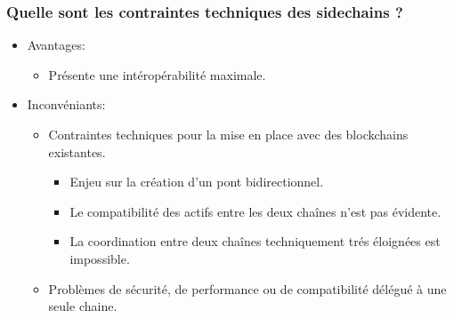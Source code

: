 \begin{frame} 
  \frametitle{Quelle sont les contraintes techniques des sidechains ?} 
  \begin{itemize} 
    \item Avantages:
    \begin{itemize}
      \item Présente une intéropérabilité maximale.
    \end{itemize}
    \item Inconvéniants:
    \begin{itemize}
      \item Contraintes techniques pour la mise en place avec des blockchains existantes.
      \begin{itemize}
        \item Enjeu sur la création d’un pont bidirectionnel.
        \item Le compatibilité des actifs entre les deux chaînes n'est pas évidente. 
        \item La coordination entre deux chaînes techniquement trés éloignées est impossible.
      \end{itemize}
      \item Problèmes de sécurité, de performance ou de compatibilité délégué à une seule chaine.
    \end{itemize}
  \end{itemize} 
\end{frame}
